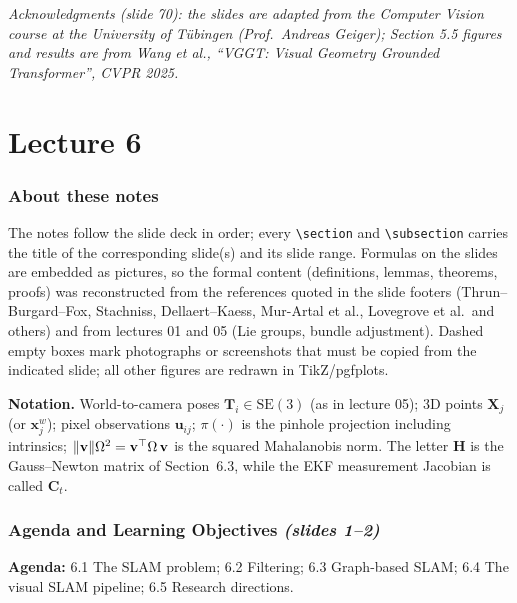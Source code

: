 \documentclass[11pt,a4paper]{article}
\newcommand{\slr}[1]{\texorpdfstring{\emph{(slides #1)}}{(slides #1)}}
\newcommand{\bX}{\mathbf{X}}
\newcommand{\bH}{\mathbf{H}}
\newcommand{\bC}{\mathbf{C}}
\newcommand{\bT}{\mathbf{T}}
\newcommand{\SE}{\mathrm{SE}(3)}
\theoremstyle{definition}
\theoremstyle{plain}
\theoremstyle{remark}
\begin{document}
\vfill
\noindent\small\emph{Acknowledgments (slide 70): the slides are adapted from the Computer Vision course at the University of T\"ubingen (Prof.\ Andreas Geiger); Section 5.5 figures and results are from Wang et al., ``VGGT: Visual Geometry Grounded Transformer'', CVPR 2025.}

\newpage

\setcounter{section}{0}
\renewcommand{\thesection}{\arabic{section}}
\part{Lecture 6}

\section*{About these notes}
The notes follow the slide deck in order; every \verb|\section| and \verb|\subsection| carries the title of the corresponding slide(s) and its slide range. Formulas on the slides are embedded as pictures, so the formal content (definitions, lemmas, theorems, proofs) was reconstructed from the references quoted in the slide footers (Thrun--Burgard--Fox, Stachniss, Dellaert--Kaess, Mur-Artal et al., Lovegrove et al.\ and others) and from lectures 01 and 05 (Lie groups, bundle adjustment). Dashed empty boxes mark photographs or screenshots that must be copied from the indicated slide; all other figures are redrawn in TikZ/pgfplots.

\textbf{Notation.} World-to-camera poses $\bT_i\in\SE$ (as in lecture 05); 3D points $\bX_j$ (or $\mathbf x_j^w$); pixel observations $\mathbf u_{ij}$; $\pi(\cdot)$ is the pinhole projection including intrinsics; $\lVert \mathbf v\rVert{\Omega}^2=\mathbf v^\top\Omega\,\mathbf v$ is the squared Mahalanobis norm. The letter $\bH$ is the Gauss--Newton matrix of Section~6.3, while the EKF measurement Jacobian is called $\bC_t$.

\section*{Agenda and Learning Objectives \slr{1--2}}
\textbf{Agenda:} 6.1 The SLAM problem; 6.2 Filtering; 6.3 Graph-based SLAM; 6.4 The visual SLAM pipeline; 6.5 Research directions.
\end{document}

